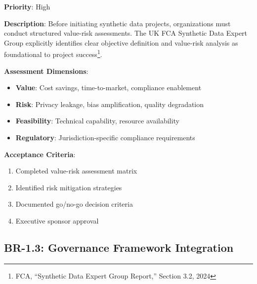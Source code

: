 \begin{tcolorbox}[colback=blue!5,colframe=blue!70,title=BR-1.2: Structured Value-Risk Assessment]
\textbf{Priority}: High

\textbf{Description}: Before initiating synthetic data projects, organizations
must conduct structured value-risk assessments. The UK FCA Synthetic Data Expert
Group explicitly identifies clear objective definition and value-risk analysis
as foundational to project success\footnote{FCA, ``Synthetic Data Expert Group
Report,'' Section 3.2, 2024}.

\textbf{Assessment Dimensions}:
\begin{itemize}
  \item \textbf{Value}: Cost savings, time-to-market, compliance enablement
  \item \textbf{Risk}: Privacy leakage, bias amplification, quality degradation
  \item \textbf{Feasibility}: Technical capability, resource availability
  \item \textbf{Regulatory}: Jurisdiction-specific compliance requirements
\end{itemize}

\textbf{Acceptance Criteria}:
\begin{enumerate}
  \item Completed value-risk assessment matrix
  \item Identified risk mitigation strategies
  \item Documented go/no-go decision criteria
  \item Executive sponsor approval
\end{enumerate}
\end{tcolorbox}

\subsection{BR-1.3: Governance Framework Integration}

